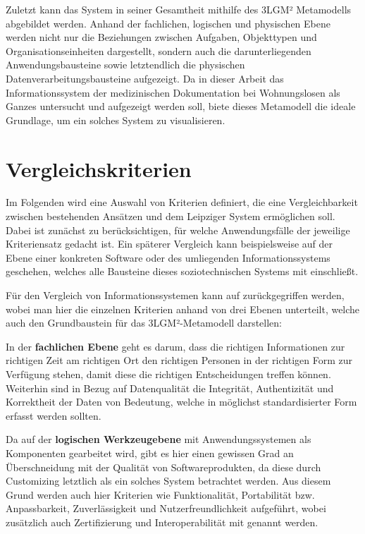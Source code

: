 Zuletzt kann das System in seiner Gesamtheit mithilfe des \ac{3LGM²} Metamodells abgebildet werden. Anhand der fachlichen, logischen und physischen Ebene werden nicht nur die Beziehungen zwischen Aufgaben, Objekttypen und Organisationseinheiten dargestellt, sondern auch die darunterliegenden Anwendungsbausteine sowie letztendlich die physischen Datenverarbeitungsbausteine aufgezeigt. Da in dieser Arbeit das Informationssystem der medizinischen Dokumentation bei Wohnungslosen als Ganzes untersucht und aufgezeigt werden soll, biete dieses Metamodell die ideale Grundlage, um ein solches System zu visualisieren.

\newpage
\section{Vergleichskriterien}\label{sec:criteria}

Im Folgenden wird eine Auswahl von Kriterien definiert, die eine Vergleichbarkeit zwischen bestehenden Ansätzen und dem Leipziger System ermöglichen soll. Dabei ist zunächst zu berücksichtigen, für welche Anwendungsfälle der jeweilige Kriteriensatz gedacht ist. Ein späterer Vergleich kann beispielsweise auf der Ebene einer konkreten Software oder des umliegenden Informationssystems geschehen, welches alle Bausteine dieses soziotechnischen Systems mit einschließt.

Für den Vergleich von Informationssystemen kann auf \citet{Winter.2023} zurückgegriffen werden, wobei man hier die einzelnen Kriterien anhand von drei Ebenen unterteilt, welche auch den Grundbaustein für das \ac{3LGM²}-Metamodell darstellen:

In der \textbf{fachlichen Ebene} geht es darum, dass die richtigen Informationen zur richtigen Zeit am richtigen Ort den richtigen Personen in der richtigen Form zur Verfügung stehen, damit diese die richtigen Entscheidungen treffen können. Weiterhin sind in Bezug auf Datenqualität die Integrität, Authentizität und Korrektheit der Daten von Bedeutung, welche in möglichst standardisierter Form erfasst werden sollten.

Da auf der \textbf{logischen Werkzeugebene} mit Anwendungssystemen als Komponenten gearbeitet wird, gibt es hier einen gewissen Grad an Überschneidung mit der Qualität von Softwareprodukten, da diese durch Customizing letztlich als ein solches System betrachtet werden. Aus diesem Grund werden auch hier Kriterien wie Funktionalität, Portabilität bzw. Anpassbarkeit, Zuverlässigkeit und Nutzerfreundlichkeit aufgeführt, wobei zusätzlich auch Zertifizierung und Interoperabilität mit genannt werden.

